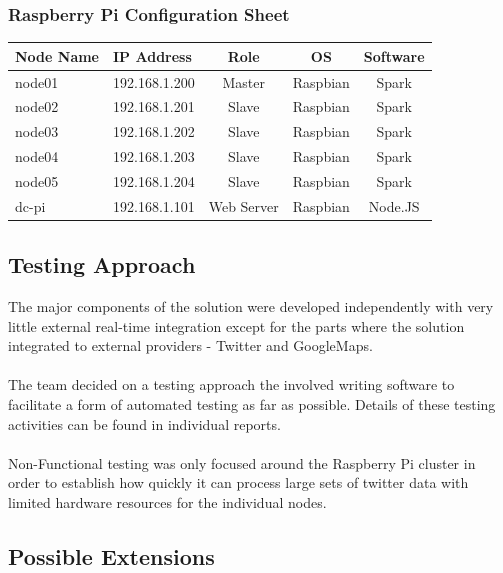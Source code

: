\documentclass[12pt]{article} %
\begin{document}
	
	\subsubsection {Raspberry Pi Configuration Sheet}

	\begin{center}
		\begin{tabular}{ | p{3cm} | p{3cm} | c | c | c |}
			\hline
			\textbf {Node Name} & \textbf {IP Address} & \textbf {Role} & \textbf {OS} & \textbf {Software}  \\
			\hline
			node01 & 192.168.1.200 & Master & Raspbian & Spark\\
			\hline
			node02 & 192.168.1.201 & Slave & Raspbian & Spark\\
			\hline
			node03 & 192.168.1.202 & Slave & Raspbian & Spark\\
			\hline
			node04 & 192.168.1.203 & Slave & Raspbian & Spark\\
			\hline
			node05 & 192.168.1.204 & Slave & Raspbian & Spark\\
			\hline
			dc-pi  & 192.168.1.101 & Web Server & Raspbian & Node.JS\\
			\hline
		\end{tabular}
	\end{center}

	\subsection{Testing Approach}
	
	The major components of the solution were developed independently with very little external real-time integration except for the parts where the solution integrated to external providers - Twitter and GoogleMaps.
	\\
	\\
	The team decided on a testing approach the involved writing software to facilitate a form of automated testing as far as possible. Details of these testing activities can be found in individual reports.
	\\
	\\
	Non-Functional testing was only focused around the Raspberry Pi cluster in order to establish how quickly it can process large sets of twitter data with limited hardware resources for the individual nodes.
	
	\subsection{Possible Extensions}
	
\end{document}
